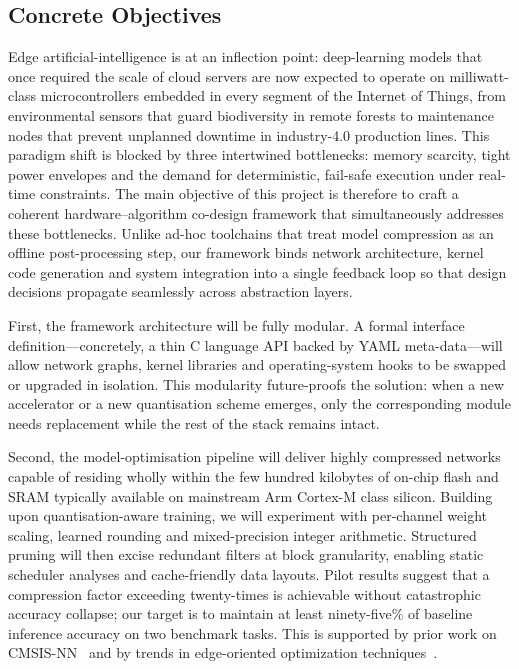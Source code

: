 \subsection{Concrete Objectives}
Edge artificial-intelligence is at an inflection point: deep-learning models that once required the scale of cloud servers are now expected to operate on milliwatt-class microcontrollers embedded in every segment of the Internet of Things, from environmental sensors that guard biodiversity in remote forests to maintenance nodes that prevent unplanned downtime in industry-4.0 production lines. This paradigm shift is blocked by three intertwined bottlenecks: memory scarcity, tight power envelopes and the demand for deterministic, fail-safe execution under real-time constraints. The main objective of this project is therefore to craft a coherent hardware–algorithm co-design framework that simultaneously addresses these bottlenecks. Unlike ad-hoc toolchains that treat model compression as an offline post-processing step, our framework binds network architecture, kernel code generation and system integration into a single feedback loop so that design decisions propagate seamlessly across abstraction layers.

First, the framework architecture will be fully modular. A formal interface definition—concretely, a thin C language API backed by YAML meta-data—will allow network graphs, kernel libraries and operating-system hooks to be swapped or upgraded in isolation. This modularity future-proofs the solution: when a new accelerator or a new quantisation scheme emerges, only the corresponding module needs replacement while the rest of the stack remains intact.

Second, the model-optimisation pipeline will deliver highly compressed networks capable of residing wholly within the few hundred kilobytes of on-chip flash and SRAM typically available on mainstream Arm Cortex-M class silicon. Building upon quantisation-aware training, we will experiment with per-channel weight scaling, learned rounding and mixed-precision integer arithmetic. Structured pruning will then excise redundant filters at block granularity, enabling static scheduler analyses and cache-friendly data layouts. Pilot results suggest that a compression factor exceeding twenty-times is achievable without catastrophic accuracy collapse; our target is to maintain at least ninety-five\% of baseline inference accuracy on two benchmark tasks. This is supported by prior work on CMSIS-NN~\cite{lai2018cmsisnn} and by trends in edge-oriented optimization techniques~\cite{zhang2025survey}.

